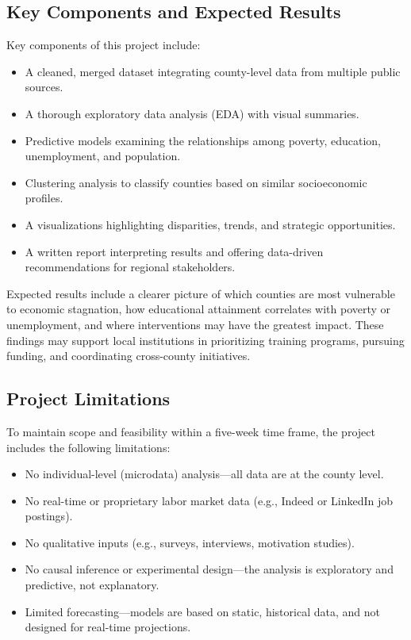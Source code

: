 \documentclass[12pt]{llncs}
\begin{document}
\subsection{Key Components and Expected Results}
Key components of this project include:
\begin{itemize}
    \item A cleaned, merged dataset integrating county-level data from multiple public sources.
    \item A thorough exploratory data analysis (EDA) with visual summaries.
    \item Predictive models examining the relationships among poverty, education, unemployment, and population.
    \item Clustering analysis to classify counties based on similar socioeconomic profiles.
    \item A visualizations highlighting disparities, trends, and strategic opportunities.
    \item A written report interpreting results and offering data-driven recommendations for regional stakeholders.
\end{itemize}

Expected results include a clearer picture of which counties are most vulnerable to economic stagnation, how educational attainment correlates with poverty or unemployment, and where interventions may have the greatest impact. These findings may support local institutions in prioritizing training programs, pursuing funding, and coordinating cross-county initiatives.

\subsection{Project Limitations}
To maintain scope and feasibility within a five-week time frame, the project includes the following limitations:
\begin{itemize}
    \item No individual-level (microdata) analysis—all data are at the county level.
    \item No real-time or proprietary labor market data (e.g., Indeed or LinkedIn job postings).
    \item No qualitative inputs (e.g., surveys, interviews, motivation studies).
    \item No causal inference or experimental design—the analysis is exploratory and predictive, not explanatory.
    \item Limited forecasting—models are based on static, historical data, and not designed for real-time projections.
\end{itemize}
\end{document}
